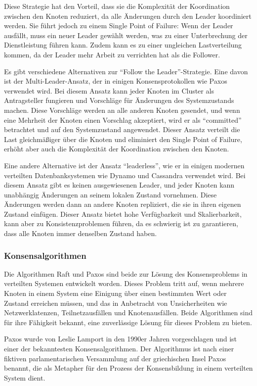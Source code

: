 Diese Strategie hat den Vorteil, dass sie die Komplexität der Koordination zwischen den Knoten reduziert, da alle Änderungen durch den Leader koordiniert werden. Sie führt jedoch zu einem Single Point of Failure: Wenn der Leader ausfällt, muss ein neuer Leader gewählt werden, was zu einer Unterbrechung der Dienstleistung führen kann. Zudem kann es zu einer ungleichen Lastverteilung kommen, da der Leader mehr Arbeit zu verrichten hat als die Follower.

Es gibt verschiedene Alternativen zur \enquote{Follow the Leader}-Strategie. Eine davon ist der Multi-Leader-Ansatz, der in einigen Konsensprotokollen wie Paxos verwendet wird. Bei diesem Ansatz kann jeder Knoten im Cluster als Antragsteller fungieren und Vorschläge für Änderungen des Systemzustands machen. Diese Vorschläge werden an alle anderen Knoten gesendet, und wenn eine Mehrheit der Knoten einen Vorschlag akzeptiert, wird er als \enquote{committed} betrachtet und auf den Systemzustand angewendet. Dieser Ansatz verteilt die Last gleichmäßiger über die Knoten und eliminiert den Single Point of Failure, erhöht aber auch die Komplexität der Koordination zwischen den Knoten.

Eine andere Alternative ist der Ansatz \enquote{leaderless}, wie er in einigen modernen verteilten Datenbanksystemen wie Dynamo und Cassandra verwendet wird. Bei diesem Ansatz gibt es keinen ausgewiesenen Leader, und jeder Knoten kann unabhängig Änderungen an seinem lokalen Zustand vornehmen. Diese Änderungen werden dann an andere Knoten repliziert, die sie in ihren eigenen Zustand einfügen. Dieser Ansatz bietet hohe Verfügbarkeit und Skalierbarkeit, kann aber zu Konsistenzproblemen führen, da es schwierig ist zu garantieren, dass alle Knoten immer denselben Zustand haben.


\subsubsection{Konsensalgorithmen}

Die Algorithmen Raft und Paxos sind beide zur Lösung des Konsensproblems in verteilten Systemen entwickelt worden. Dieses Problem tritt auf, wenn mehrere Knoten in einem System eine Einigung über einen bestimmten Wert oder Zustand erreichen müssen, und das in Anbetracht von Unsicherheiten wie Netzwerklatenzen, Teilnetzausfällen und Knotenausfällen. Beide Algorithmen sind für ihre Fähigkeit bekannt, eine zuverlässige Lösung für dieses Problem zu bieten.

Paxos wurde von Leslie Lamport in den 1990er Jahren vorgeschlagen und ist einer der bekanntesten Konsensalgorithmen. Der Algorithmus ist nach einer fiktiven parlamentarischen Versammlung auf der griechischen Insel Paxos benannt, die als Metapher für den Prozess der Konsensbildung in einem verteilten System dient.


